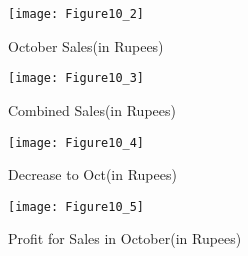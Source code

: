 \documentclass[journal,12pt,twocolumn]{IEEEtran}
\begin{document}
\begin{figure}[!ht]
\centering
\texttt{[image: Figure10\_2]}
\caption{October Sales(in Rupees)}
\label{fig:OcttSales}	
\end{figure}

\begin{figure}[!ht]
\centering
\texttt{[image: Figure10\_3]}
\caption{Combined Sales(in Rupees)}
\label{fig:Combined}	
\end{figure}

\begin{figure}[!ht]
\centering
\texttt{[image: Figure10\_4]}
\caption{Decrease  to Oct(in Rupees)}
\label{fig:Decrease}	
\end{figure}

\begin{figure}[!ht]
\centering
\texttt{[image: Figure10\_5]}
\caption{Profit for Sales in October(in Rupees)}
\label{fig:Profit}	
\end{figure}
\end{document}
